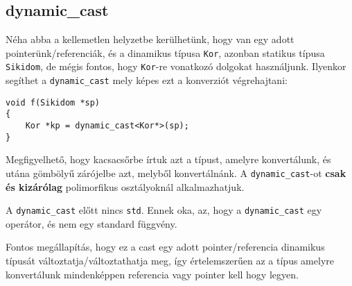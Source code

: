 \documentclass[a4paper,11.5pt,table]{article}
\begin{document}
	\subsection{dynamic\_cast}
	Néha abba a kellemetlen helyzetbe kerülhetünk, hogy van egy adott pointerünk/referenciák, és a dinamikus típusa \texttt{Kor}, azonban statikus típusa \texttt{Sikidom}, de mégis fontos, hogy \texttt{Kor}-re vonatkozó dolgokat használjunk. Ilyenkor segíthet a \texttt{dynamic\_cast} mely képes ezt a konverziót végrehajtani:
	\begin{lstlisting}
void f(Sikidom *sp)
{
	Kor *kp = dynamic_cast<Kor*>(sp);
}
	\end{lstlisting}
	Megfigyelhető, hogy kacsacsőrbe írtuk azt a típust, amelyre konvertálunk, és utána gömbölyű zárójelbe azt, melyből konvertálnánk. A \texttt{dynamic\_cast}-ot \textbf{csak és kizárólag} polimorfikus osztályoknál alkalmazhatjuk.
	\begin{note}
		A \texttt{dynamic\_cast} előtt nincs \texttt{std}. Ennek oka, az, hogy a \texttt{dynamic\_cast} egy operátor, és nem egy standard függvény.
	\end{note}
	Fontos megállapítás, hogy ez a cast egy adott pointer/referencia dinamikus típusát változtatja/változtathatja meg, így értelemszerűen az a típus amelyre konvertálunk mindenképpen referencia vagy pointer kell hogy legyen.
\end{document}
